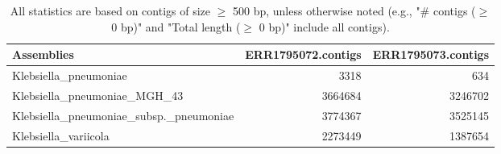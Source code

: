 \documentclass[12pt,a4paper]{article}
\begin{document}
\begin{table}[ht]
\begin{center}
\caption{All statistics are based on contigs of size $\geq$ 500 bp, unless otherwise noted (e.g., "\# contigs ($\geq$ 0 bp)" and "Total length ($\geq$ 0 bp)" include all contigs).}
\begin{tabular}{|l*{2}{|r}|}
\hline
Assemblies & ERR1795072.contigs & ERR1795073.contigs \\ \hline
Klebsiella\_pneumoniae & 3318 & 634 \\ \hline
Klebsiella\_pneumoniae\_MGH\_43 & 3664684 & 3246702 \\ \hline
Klebsiella\_pneumoniae\_subsp.\_pneumoniae & 3774367 & 3525145 \\ \hline
Klebsiella\_variicola & 2273449 & 1387654 \\ \hline
\end{tabular}
\end{center}
\end{table}
\end{document}

